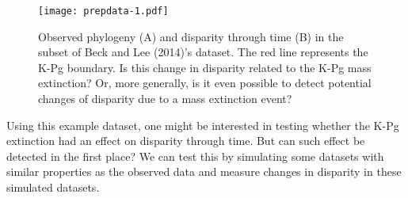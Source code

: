 \documentclass[
]{article}
\newenvironment{Shaded}{\begin{snugshade}}{\end{snugshade}}
\newcommand{\CommentTok}[1]{\textcolor[rgb]{0.56,0.35,0.01}{\textit{#1}}}
\newcommand{\DataTypeTok}[1]{\textcolor[rgb]{0.13,0.29,0.53}{#1}}
\newcommand{\DecValTok}[1]{\textcolor[rgb]{0.00,0.00,0.81}{#1}}
\newcommand{\KeywordTok}[1]{\textcolor[rgb]{0.13,0.29,0.53}{\textbf{#1}}}
\newcommand{\NormalTok}[1]{#1}
\newcommand{\OperatorTok}[1]{\textcolor[rgb]{0.81,0.36,0.00}{\textbf{#1}}}
\newcommand{\OtherTok}[1]{\textcolor[rgb]{0.56,0.35,0.01}{#1}}
\newcommand{\StringTok}[1]{\textcolor[rgb]{0.31,0.60,0.02}{#1}}
\begin{document}
\begin{Shaded}
\end{Shaded}

\begin{figure}
\centering
\texttt{[image: prepdata-1.pdf]}
\caption{Observed phylogeny (A) and disparity through time (B) in the
subset of Beck and Lee (2014)'s dataset. The red line represents the
K-Pg boundary. Is this change in disparity related to the K-Pg mass
extinction? Or, more generally, is it even possible to detect potential
changes of disparity due to a mass extinction event?}
\end{figure}

Using this example dataset, one might be interested in testing whether
the K-Pg extinction had an effect on disparity through time. But can
such effect be detected in the first place? We can test this by
simulating some datasets with similar properties as the observed data
and measure changes in disparity in these simulated datasets.
\end{document}
